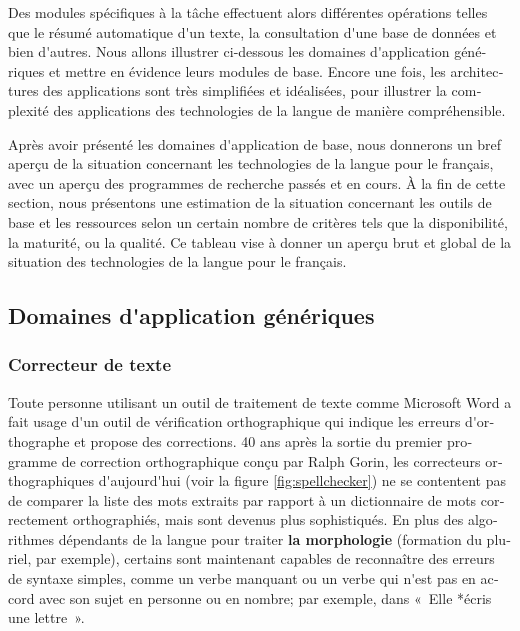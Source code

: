 \begin{french}
\begin{multicols}{2}
Des modules spécifiques à la tâche effectuent alors différentes
opérations telles que le résumé automatique d{\mbox '}un texte, la
consultation d{\mbox '}une base de données et bien d{\mbox '}autres. Nous allons
illustrer ci-dessous les domaines d{\mbox '}application génériques et mettre
en évidence leurs modules de base. Encore une fois, les architectures
des applications sont très simplifiées et idéalisées, pour illustrer
la complexité des applications des technologies de la langue de
manière compréhensible.

Après avoir présenté les domaines d{\mbox '}application de base, nous
donnerons un bref aperçu de la situation concernant les technologies
de la langue pour le français, avec un aperçu des programmes de
recherche passés et en cours. À la fin de cette section, nous
présentons une estimation de la situation concernant les outils de
base et les ressources selon un certain nombre de critères tels que la
disponibilité, la maturité, ou la qualité. Ce tableau vise à donner un
aperçu brut et global de la situation des technologies de la langue
pour le français.

\subsection{Domaines d{\mbox '}application génériques}
%
\subsubsection{Correcteur de texte}
%
Toute personne utilisant un outil de traitement de texte comme
Microsoft Word a fait usage d{\mbox '}un outil de vérification orthographique
qui indique les erreurs d{\mbox '}orthographe et propose des corrections.  40
ans après la sortie du premier programme de correction orthographique
conçu par Ralph Gorin, les correcteurs orthographiques d{\mbox '}aujourd{\mbox '}hui
(voir la figure \ref{fig:spellchecker}) ne se contentent pas de
comparer la liste des mots extraits par rapport à un dictionnaire de
mots correctement orthographiés, mais sont devenus plus
sophistiqués. En plus des algorithmes dépendants de la langue pour
traiter {\bf la morphologie} (formation du pluriel, par exemple),
certains sont maintenant capables de reconnaître des erreurs de
syntaxe simples, comme un verbe manquant ou un verbe qui n{\mbox '}est pas en
accord avec son sujet en personne ou en nombre; par exemple, dans
«~Elle *écris une lettre~».

\begin{figure}[t]


\end{figure}
\end{multicols}
\end{french}
